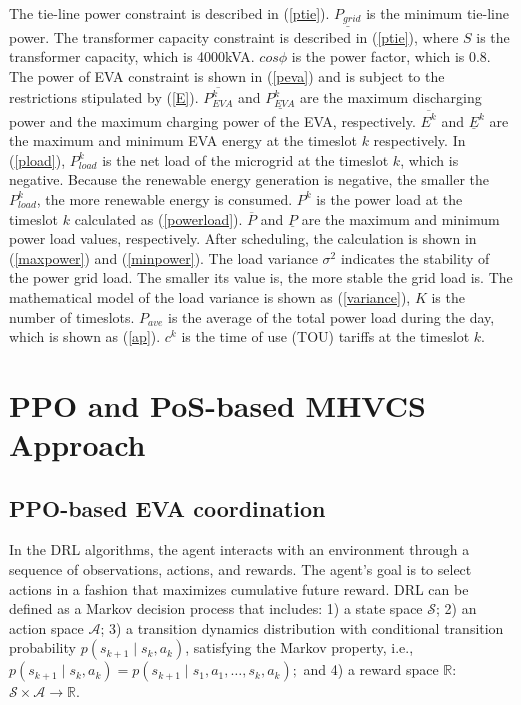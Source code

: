 \documentclass[journal,twoside]{IEEEtran}
\begin{document}
The tie-line power constraint is described in (\ref{ptie}). $\underline{P_{grid}}$ is the minimum tie-line power.
The transformer capacity constraint is described in (\ref{ptie}), where $S$ is the transformer capacity, which is 4000kVA. $cos\phi$ is the power factor, which is 0.8.
The power of EVA constraint is shown in (\ref{peva}) and is subject to the restrictions stipulated by (\ref{E}).
$\overline{P_{EVA}^k}$ and $\underline{P_{EVA}^k}$ are the maximum discharging power and the maximum charging power of the EVA, respectively. $\overline{E^k}$ and $\underline{E}^k$ are the maximum and minimum EVA energy at the timeslot $k$ respectively.
In (\ref{pload}), $P_{load}^k$ is the net load of the microgrid at the timeslot $k$, which is negative. Because the renewable energy generation is negative, the smaller the $P_{load}^k$, the more renewable energy is consumed.
$P^{k}$ is the power load at the timeslot $k$ calculated as (\ref{powerload}).
$\overline{P}$ and $\underline{P}$ are the maximum and minimum power load values, respectively. After scheduling, the calculation is shown in (\ref{maxpower}) and (\ref{minpower}).
The load variance $\sigma^{2}$ indicates the stability of the power grid load. The smaller its value is, the more stable the grid load is. The mathematical model of the load variance is shown as (\ref{variance}), $K$ is the number of timeslots.
$P_{ave}$ is the average of the total power load during the day, which is shown as (\ref{ap}).
$c^{k}$ is the time of use (TOU) tariffs at the timeslot $k$.

  
\section{PPO and PoS-based MHVCS Approach}
\subsection{PPO-based EVA coordination}
In the DRL algorithms, the agent interacts with an environment through a sequence of observations, actions, and rewards. The agent's goal is to select actions in a fashion that maximizes cumulative future reward\cite{mnih2015human}. DRL can be defined as a Markov decision process that includes: 1) a state space $\mathcal{S}$; 2) an action space $\mathcal{A}$; 3) a transition dynamics distribution with conditional transition probability $p\left(s_{k+1} \mid s_{k}, a_{k}\right)$, satisfying the Markov property, i.e., $p\left(s_{k+1} \mid s_{k}, a_{k}\right)=p\left(s_{k+1} \mid s_{1}, a_{1}, \ldots, s_{k}, a_{k}\right);$ and 4) a reward space $\mathbb{R}$: $\mathcal{S} \times \mathcal{A} \rightarrow \mathbb{R}$.
\end{document}
